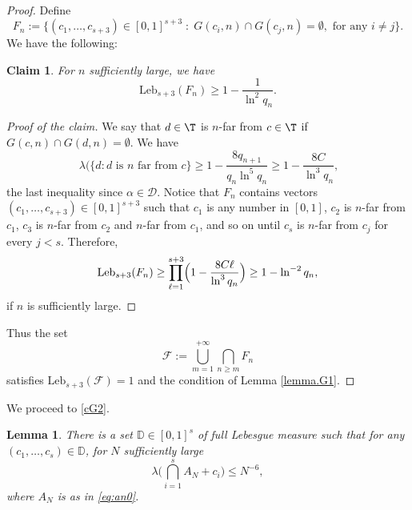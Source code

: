 \documentclass[10pt]{amsart}
\newcommand\cD{\mathcal{D}}
\newcommand\cF{\mathcal{F}}
\newcommand\Leb{\mathrm{Leb}}
\theoremstyle{definition}
\theoremstyle{plain}
\newtheorem{lemma}[definition]{Lemma}
\newtheorem*{claim}{Claim}
\begin{document}
\begin{proof} Define
\begin{equation}\label{eq:fn}
F_n:=\big\{(c_1,\ldots, c_{s+3})\in [0,1]^{s+3}\;:\; G(c_i,n)\cap G(c_j,n)=\emptyset, \text{ for any } i\neq j\big\}.
\end{equation}
We have the following:

\begin{claim}
For $n$ sufficiently large, we have
\[
\Leb_{s+3}(F_n)\geq 1-\frac{1}{\ln^2q_n}.
\]
\end{claim}

\begin{proof}[Proof of the claim] We say that $d\in \T$ is $n$-far from $c\in \T$ if $G(c,n)\cap G(d,n)=\emptyset$. We have
\[
\
\lambda(\{d: d \text{ is } n \text{ far from } c\}\geq 1-\frac{8q_{n+1}}{q_n\ln^5q_n}\geq 1-\frac{8{C}}{\ln^3q_n},
\] the last inequality since $\alpha\in \cD$. Notice that $F_n$ contains vectors $(c_1,\ldots,c_{s+3})\in [0,1]^{s+3}$ such that $c_1$ is any number in $[0,1]$, $c_2$ is $n$-far from $c_1$, $c_3$ is $n$-far from $c_2$ and $n$-far from $c_1$, and so on until $c_s$ is $n$-far from $c_j$ for every $j<s$. Therefore,
\[
\Leb_{s+3}(F_n)\geq \prod_{\ell=1}^{s+3} \Bigl(1-\frac{8{C}\ell}{\ln^3q_n}\Bigr)\geq 1-\ln^{-2}q_n,
\]
if $n$ is sufficiently large.
\end{proof}
Thus the set
\begin{equation*}%
\cF:=\bigcup_{m=1}^{+\infty} \bigcap_{n\geq m}F_n
\end{equation*}
satisfies $\Leb_{s+3}(\cF)=1$ and the condition of Lemma \ref{lemma.G1}.
\end{proof}

We proceed to \eqref{cG2}.

\begin{lemma} \label{lemma.G2}There is a set
$\mathbb{D}\in [0,1]^s$ of full Lebesgue measure such that for any $(c_1,\ldots,c_s)\in \mathbb{D}$, for $N$ sufficiently large
\[
\lambda\Big(\bigcap_{i=1}^sA_N+c_{i}\Big)\leq N^{-6},
\]
where $A_N$ is as in \eqref{eq:an0}.
\end{lemma}
\end{document}
